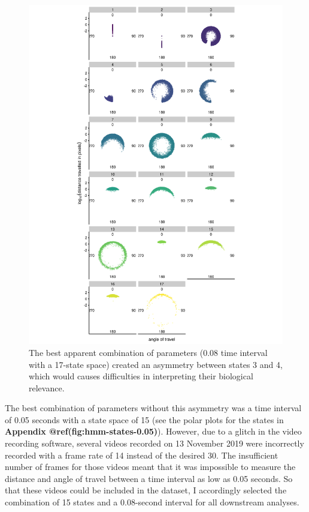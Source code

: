 \documentclass[
]{article}
\begin{document}
\begin{figure}
\includegraphics[width=1\linewidth]{figs/mikk_behaviour/0.08_17_polar_all_dge} \caption{The best apparent combination of parameters (0.08 time interval with a 17-state space) created an asymmetry between states 3 and 4, which would causes difficulties in interpreting their biological relevance.}\label{fig:mikk-hmm-asym}
\end{figure}

The best combination of parameters without this asymmetry was a time interval of 0.05 seconds with a state space of 15 (see the polar plots for the states in \textbf{Appendix @ref(fig:hmm-states-0.05)}). However, due to a glitch in the video recording software, several videos recorded on 13 November 2019 were incorrectly recorded with a frame rate of 14 instead of the desired 30. The insufficient number of frames for those videos meant that it was impossible to measure the distance and angle of travel between a time interval as low as 0.05 seconds. So that these videos could be included in the dataset, I accordingly selected the combination of 15 states and a 0.08-second interval for all downstream analyses.
\end{document}
